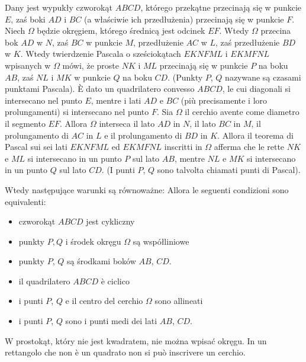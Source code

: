 \begin{proposition}
Dany jest wypukły czworokąt $ABCD$, którego przekątne przecinają się w punkcie $E$, zaś boki $AD$ i $BC$ (a właściwie ich przedłużenia) przecinają się w punkcie $F$. %
Niech $\Omega$ będzie okręgiem, którego średnicą jest odcinek $EF$. %
Wtedy $\Omega$ przecina bok $AD$ w $N$, zaś $BC$ w punkcie $M$, przedłużenie $AC$ w $L$, zaś przedłużenie $BD$ w $K$. %
Wtedy twierdzenie Pascala o sześciokątach $EKNFML$ i $EKMFNL$ wpisanych w $\Omega$ mówi, że proste $NK$ i $ML$ przecinają się w punkcie $P$ na boku $AB$, zaś $NL$ i $MK$ w punkcie $Q$ na boku $CD$. %
(Punkty $P$, $Q$ nazywane są czasami punktami Pascala). %
È dato un quadrilatero convesso $ABCD$, le cui diagonali si intersecano nel punto $E$, mentre i lati $AD$ e $BC$ (più precisamente i loro prolungamenti) si intersecano nel punto $F$. %
Sia $\Omega$ il cerchio avente come diametro il segmento $EF$. %
Allora $\Omega$ interseca il lato $AD$ in $N$, il lato $BC$ in $M$, il prolungamento di $AC$ in $L$ e il prolungamento di $BD$ in $K$. %
Allora il teorema di Pascal sui sei lati $EKNFML$ ed $EKMFNL$ inscritti in $\Omega$ afferma che le rette $NK$ e $ML$ si intersecano in un punto $P$ sul lato $AB$, mentre $NL$ e $MK$ si intersecano in un punto $Q$ sul lato $CD$. %
(I punti $P$, $Q$ sono talvolta chiamati punti di Pascal). %

Wtedy następujące warunki są równoważne: %
Allora le seguenti condizioni sono equivalenti: %
\begin{itemize}
\item czworokąt $ABCD$ jest cykliczny %
\item punkty $P, Q$ i środek okręgu $\Omega$ są współliniowe %
\item punkty $P$, $Q$ są środkami boków $AB$, $CD$. %
\item il quadrilatero $ABCD$ è ciclico %
\item i punti $P$, $Q$ e il centro del cerchio $\Omega$ sono allineati %
\item i punti $P$, $Q$ sono i punti medi dei lati $AB$, $CD$. %
\end{itemize}
\end{proposition}

W prostokąt, który nie jest kwadratem, nie można wpisać okręgu. %
In un rettangolo che non è un quadrato non si può inscrivere un cerchio. %

